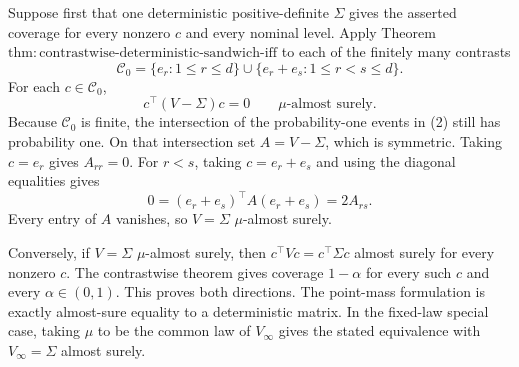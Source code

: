 Suppose first that one deterministic positive-definite \(\Sigma\) gives the asserted coverage for every nonzero \(c\) and every nominal level. Apply Theorem \(\mathrm{thm:contrastwise\text{-}deterministic\text{-}sandwich\text{-}iff}\) to each of the finitely many contrasts
\[
 \mathcal C_0=\{e_r:1\le r\le d\}\cup\{e_r+e_s:1\le r<s\le d\}. \tag{1}
\]
For each \(c\in\mathcal C_0\),
\[
 c^\top(V-\Sigma)c=0\qquad\mu\text{-almost surely}. \tag{2}
\]
Because \(\mathcal C_0\) is finite, the intersection of the probability-one events in (2) still has probability one. On that intersection set \(A=V-\Sigma\), which is symmetric. Taking \(c=e_r\) gives \(A_{rr}=0\). For \(r<s\), taking \(c=e_r+e_s\) and using the diagonal equalities gives
\[
 0=(e_r+e_s)^\top A(e_r+e_s)=2A_{rs}. \tag{3}
\]
Every entry of \(A\) vanishes, so \(V=\Sigma\) \(\mu\)-almost surely.

Conversely, if \(V=\Sigma\) \(\mu\)-almost surely, then \(c^\top Vc=c^\top\Sigma c\) almost surely for every nonzero \(c\). The contrastwise theorem gives coverage \(1-\alpha\) for every such \(c\) and every \(\alpha\in(0,1)\). This proves both directions. The point-mass formulation is exactly almost-sure equality to a deterministic matrix. In the fixed-law special case, taking \(\mu\) to be the common law of \(V_\infty\) gives the stated equivalence with \(V_\infty=\Sigma\) almost surely.